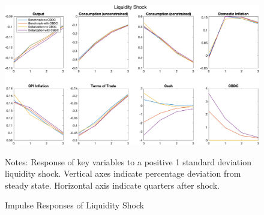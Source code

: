 \documentclass[12pt]{article}
\begin{document}
\begin{figure}[h!]
\includegraphics[width=\textwidth]{Liquidity}
\label{IRF3}
\caption{Impulse Responses of Liquidity Shock}
\scriptsize{Notes: Response of key variables to a positive 1 standard deviation liquidity shock. Vertical axes indicate percentage deviation from steady state. Horizontal axis indicate quarters after shock. }
\end{figure}
\end{document}
